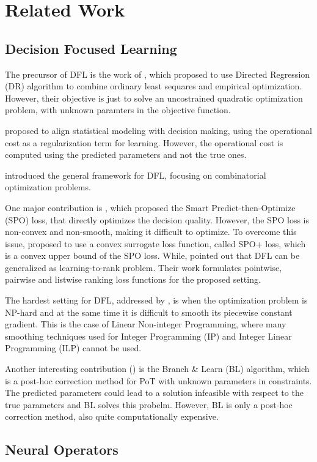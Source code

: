 \section{Related Work} 

\subsection{Decision Focused Learning}
The precursor of DFL is the work of \cite{kao2009directed}, which proposed to use Directed Regression (DR) algorithm 
to combine ordinary least sequares and empirical optimization. However, their objective is just to solve an uncostrained 
quadratic optimization problem, with unknown paramters in the objective function.

\cite{tulabandhula2013machine} proposed to align statistical modeling with decision making, using the operational cost 
as a regularization term for learning. However, the operational cost is computed using the predicted parameters and 
not the true ones.

\cite{wilder2019melding} introduced the general framework for DFL, focusing on combinatorial optimization problems.

One major contribution is \cite{elmachtoub2022smart}, which proposed the Smart Predict-then-Optimize (SPO) loss, 
that directly optimizes the decision quality. However, the SPO loss is non-convex and non-smooth, making it difficult to optimize. 
To overcome this issue, \cite{elmachtoub2022smart} proposed to use a convex surrogate loss function, 
called SPO+ loss, which is a convex upper bound of the SPO loss.
While, \cite{mandi2022decision} pointed out that DFL can be generalized as learning-to-rank problem. 
Their work formulates pointwise, pairwise and listwise ranking loss functions for the proposed setting.

The hardest setting for DFL, addressed by \cite{ferber2023surco}, is when the optimization problem is NP-hard 
and at the same time it is difficult to smooth its piecewise constant gradient. This is the case of Linear Non-integer Programming, 
where many smoothing techniques used for Integer Programming (IP) and Integer Linear Programming (ILP) cannot be used.

Another interesting contribution (\cite{hu2023branch}) is the Branch \& Learn (BL) algorithm, 
which is a post-hoc correction method for PoT with unknown parameters in constraints. 
The predicted parameters could lead to a solution infeasible with respect to the true parameters and BL solves this probelm. 
However, BL is only a post-hoc correction method, also quite computationally expensive.

\subsection{Neural Operators}
